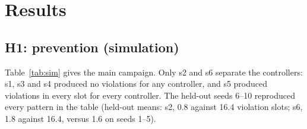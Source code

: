 
\section{Results}
\label{sec:results}

\subsection{H1: prevention (simulation)}

Table~\ref{tab:sim} gives the main campaign. Only s2 and s6 separate the
controllers: s1, s3 and s4 produced no violations for any controller, and s5
produced violations in every slot for every controller. The held-out seeds 6--10
reproduced every pattern in the table (held-out means: s2, 0.8 against 16.4
violation slots; s6, 1.8 against 16.4, versus 1.6 on seeds 1--5).

